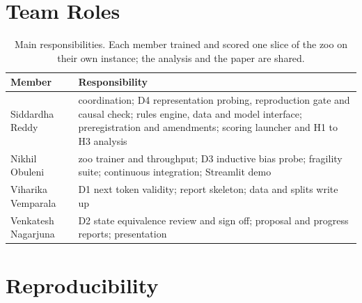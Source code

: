 \documentclass[11pt]{scrartcl}
\begin{document}
\appendix
\section{Team Roles}

\begin{table}[H]
    \centering
    \small
    \begin{tabular}{l>{\raggedright\arraybackslash}p{10.5cm}}
    \toprule
    Member & Responsibility \\
    \midrule
    Siddardha Reddy & coordination; D4 representation probing, reproduction gate and causal check; rules engine,
    data and model interface; preregistration and amendments; scoring launcher and H1 to H3 analysis \\
    Nikhil Obuleni & zoo trainer and throughput; D3 inductive bias probe; fragility suite; continuous
    integration; Streamlit demo \\
    Viharika Vemparala & D1 next token validity; report skeleton; data and splits write up \\
    Venkatesh Nagarjuna & D2 state equivalence review and sign off; proposal and progress reports; presentation \\
    \bottomrule
    \end{tabular}
    \caption{Main responsibilities. Each member trained and scored one slice of the zoo on their own instance;
    the analysis and the paper are shared.}
\end{table}

\section{Reproducibility}
\end{document}
